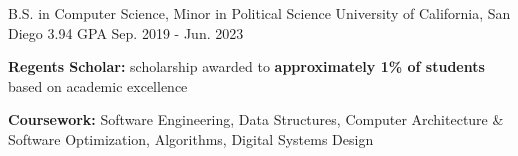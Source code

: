

\begin{cventries}

    \cventry
    {B.S. in Computer Science, Minor in Political Science} %
    {University of California, San Diego} %
    {3.94 GPA} %
    {Sep. 2019 - Jun. 2023} %
    {
      \begin{cvitems} %
        \item {\textbf{Regents Scholar:} scholarship awarded to \textbf{approximately 1\% of students} based on academic excellence}
        \item {\textbf{Coursework:} Software Engineering, Data Structures, Computer Architecture \& Software Optimization, Algorithms, Digital Systems Design}
      \end{cvitems}
    }

\end{cventries}
